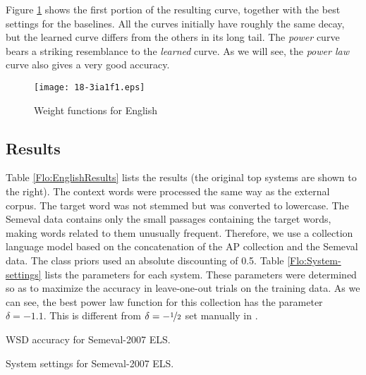 \documentclass[english]{jnlp_1.4}
\begin{document}
Figure \ref{fig:Weight-functions-for-english} shows the first portion
of the resulting curve, together with the best settings for the baselines.
All the curves initially have roughly the same decay, but the learned
curve differs from the others in its long tail. The \emph{power} curve
bears a striking resemblance to the \emph{learned} curve. As we will
see, the \emph{power law} curve also gives a very good accuracy. 

\begin{figure}[t]
\begin{center}
\texttt{[image: 18-3ia1f1.eps]}
\end{center}
\caption{Weight functions for English}
\label{fig:Weight-functions-for-english}
\vspace{1\baselineskip}
\end{figure}


\subsection{Results}

Table \ref{Flo:EnglishResults} lists the results (the original top
systems are shown to the right). 
The context words were processed the same way as the external corpus.
The target word was not stemmed but was converted to lowercase. The
Semeval data contains only the small passages containing the target
words, making words related to them unusually frequent. Therefore,
we use a collection language model based on the concatenation of the
AP collection and the Semeval data. The class priors used an absolute
discounting of 0.5. Table \ref{Flo:System-settings} lists the parameters
for each system. These parameters were determined so as to maximize
the accuracy in leave-one-out trials on the training data. As we can
see, the best power law function for this collection has the parameter
$\delta=-1.1$. This is different from $\delta=-\nicefrac{1}{2}$
set manually in \cite{OhChoiWsdStaticDynamicVector}. 

\begin{table}[t]
\caption{WSD accuracy for Semeval-2007 ELS.}
\label{Flo:EnglishResults}

\vspace{-1\baselineskip}
\end{table}

\begin{table}[t]
\caption{System settings for Semeval-2007 ELS.}
\label{Flo:System-settings}

\end{table}
\end{document}
